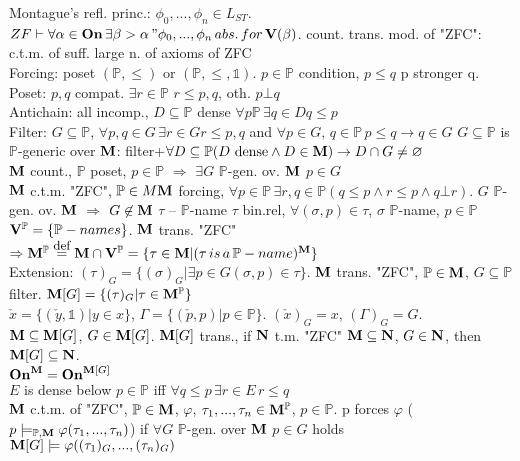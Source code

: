 \documentclass[9pt]{article}
\newcommand{\class}[1]{{\bf #1}}
\newcommand{\Pp}{\mathbb{P}}
\newcommand{\eqdef}{\overset{\mbox{\small{def}}}{=}}
\newcommand{\On}{\class{On}}
\newcommand{\V}{\class{V}}
\begin{document}
\begin{multicols*}{2}
Montague's refl. princ.: $\phi_0,...,\phi_n\in L_{ST}$. $ZF\vdash \forall\alpha\in\On\,\exists\beta>\alpha \,"\phi_0,...,\phi_n\,abs.\,for\,\V(\beta)$. count. trans. mod. of "ZFC": c.t.m. of suff. large n. of axioms of ZFC\\
Forcing: poset $(\mathbb{P}, \leqslant)$ or $(\mathbb{P}, \leqslant,\mathbb{1})$. $p\in \Pp$ condition, $p\leqslant q$ p stronger q.\\
Poset: $p,q$ compat. $\exists r\in \Pp$ $r\leqslant p, q$, oth. $p\bot q$\\
Antichain: all incomp., $D\subseteq \Pp$ dense $\forall p\Pp\,\exists q\in D q\leqslant p$\\
Filter: $G\subseteq \Pp$, $\forall p, q\in G\,\exists r\in G r\leqslant p, q$ and $\forall p\in G,\,q\in \Pp\,p\leqslant q\rightarrow q\in G$
$G\subseteq \Pp$ is $\Pp$-generic over $\class{M}$: filter+$\forall D\subseteq \Pp (D\mbox{ dense}\wedge D\in\class{M})\rightarrow D\cap G\neq \varnothing$\\
$\class{M}$ count., $\Pp$ poset, $p\in \Pp$ $\Rightarrow$ $\exists G$ $\Pp$-gen. ov. $\class{M}$ $p\in G$\\
$\class{M}$ c.t.m. "ZFC", $\Pp\in M\class{M}$ forcing, $\forall p\in\Pp\,\exists r,q\in\Pp (q\leqslant p\wedge r\leqslant p\wedge q\bot r)$. $G$ $\Pp$-gen. ov. $\class{M}$ $\Rightarrow$ $G\not\in\class{M}$
$\tau$ -- $\Pp$-name $\tau$ bin.rel, $\forall (\sigma,p)\in\tau$, $\sigma$ $\Pp$-name, $p\in\Pp$\\
$\V^\Pp=\{\Pp-names\}$. $\class{M}$ trans. "ZFC" $\Rightarrow \class{M}^\Pp\eqdef \class{M}\cap\V^\Pp=\{\tau\in\class{M}|(\tau\,is\,a\,\Pp-name)^\class{M}\}$\\
Extension: $(\tau)_G=\{(\sigma)_G|\exists p\in G(\sigma,p)\in\tau\}$. $\class{M}$ trans. "ZFC", $\Pp\in\class{M}$, $G\subseteq \Pp$ filter. $\class{M}[G]=\{(\tau)_G|\tau\in\class{M}^\Pp\}$\\
$\check{x}=\{(\check{y},\mathbb{1})|y\in x\}$, $\Gamma=\{(\check{p},p)|p\in\Pp\}$. $(\check{x})_G=x$, $(\Gamma)_G=G$.\\
$\class{M}\subseteq\class{M}[G]$, $G\in\class{M}[G]$. $\class{M}[G]$ trans., if $\class{N}$ t.m. "ZFC" $
\class{M}\subseteq\class{N}$, $G\in\class{N}$, then $\class{M}[G]\subseteq \class{N}$.\\
$\On^\class{M}=\On^{\class{M}[G]}$\\
$E$ is dense below $p\in\Pp$ iff $\forall q\leqslant p\,\exists r\in E\,r\leqslant q$\\
$\class{M}$ c.t.m. of "ZFC", $\Pp\in\class{M}$, $\varphi$, $\tau_1,...,\tau_n\in\class{M}^\Pp$, $p\in\Pp$. p forces $\varphi$ ($p\models_{\Pp,\class{M}}\varphi(\tau_1,...,\tau_n)$) if $\forall G$ $\Pp$-gen. over $\class{M}$ $p\in G$ holds $\class{M}[G]\models\varphi((\tau_1)_G,...,(\tau_n)_G)$\\

\end{multicols*}
\end{document}
